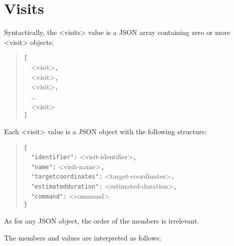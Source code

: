 \section{Visits}

Syntactically, the <visits> value is a JSON array containing zero or more <visit> objects:
\begin{quote}
\verb|[|\\
\verb|  |<visit>\verb|,|\\
\verb|  |<visit>\verb|,|\\
\verb|  |<visit>\verb|,|\\
\verb|  |\ldots\\
\verb|  |<visit>\\
\verb|]|
\end{quote}

Each <visit> value is a JSON object with the following structure:
\begin{quote}
\verb|{|\\
\verb|  "identifier":| <visit-identifier>\verb|,|\\
\verb|  "name":| <visit-name>\verb|,|\\
\verb|  "targetcoordinates":| <target-coordinates>\verb|,|\\
\verb|  "estimatedduration":| <estimated-duration>\verb|,|\\
\verb|  "command":| <command>\\
\verb|}|
\end{quote}

As for any JSON object, the order of the members is irrelevant.

The members and values are interpreted as follows:

